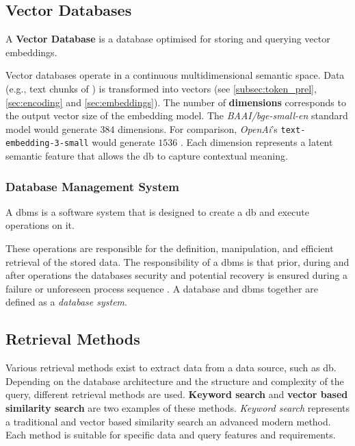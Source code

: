 \subsection{Vector Databases}\label{sec:vector_db}
\begin{definition}
    A \textbf{Vector Database} is a database optimised for storing and querying vector embeddings.
\end{definition}
Vector databases operate in a continuous multidimensional semantic space.
Data (e.g., text chunks of \citet{bb2}) is transformed into vectors (see \cref{subsec:token_prel}, \cref{sec:encoding} and \cref{sec:embeddings}).
The number of \textbf{dimensions} corresponds to the output vector size of the embedding model.
The \textit{BAAI/bge-small-en} standard model would generate $384$ dimensions.
For comparison, \textit{OpenAi}'s \texttt{text-embedding-3-small} would generate $1536$ \citep{OpenAi2024embeddings}.
Each dimension represents a latent semantic feature that allows the \ac{db} to capture contextual meaning.
%
\subsubsection{Database Management System}\label{subsub:dbm}
%
\begin{definition}\label{def:dbm}
    A \ac{dbms} is a software system that is designed to create a \ac{db} and execute operations on it.
\end{definition}
These operations are responsible for the definition, manipulation, and efficient retrieval of the stored data. 
The responsibility of a \ac{dbms} is that prior, during and after operations the databases security and potential recovery is ensured during a failure or unforeseen process sequence \citep{limited2010introduction}.
A database and \ac{dbms} together are defined as a \textit{database system}.  
%
\subsection{Retrieval Methods}\label{subsec:rag_retrieval}
%
Various retrieval methods exist to extract data from a data source, such as \ac{db}.
Depending on the database architecture and the structure and complexity of the query, different retrieval methods are used.
\textbf{Keyword search} and \textbf{vector based similarity search} are two examples of these methods.
\textit{Keyword search} represents a traditional and {vector based similarity search} an advanced modern method.
Each method is suitable for specific data and query features and requirements.
%
